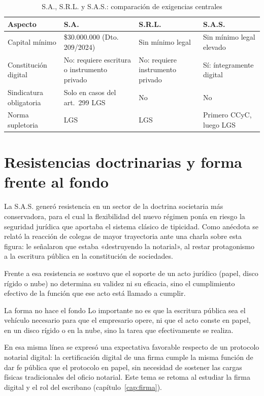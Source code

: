\documentclass[12pt,oneside]{book}
\begin{document}
\begin{table}[H]
\centering
\caption{S.A., S.R.L. y S.A.S.: comparación de exigencias centrales}
\renewcommand{\arraystretch}{1.2}
\begin{tabularx}{\textwidth}{>{\raggedright\arraybackslash}p{}XXX}
\toprule
\textbf{Aspecto} & \textbf{S.A.} & \textbf{S.R.L.} & \textbf{S.A.S.} \\
\midrule
Capital mínimo & \$30.000.000 (Dto. 209/2024) & Sin mínimo legal & Sin mínimo legal elevado \\
Constitución digital & No: requiere escritura o instrumento privado & No: requiere instrumento privado & Sí: íntegramente digital \\
Sindicatura obligatoria & Solo en casos del art.~299 LGS & No & No \\
Norma supletoria & LGS & LGS & Primero CCyC, luego LGS \\
\bottomrule
\end{tabularx}
\end{table}

\section{Resistencias doctrinarias y forma frente al fondo}
\label{sec:forma}

La S.A.S. generó resistencia en un sector de la doctrina societaria más conservadora, para el cual la flexibilidad del nuevo régimen ponía en riesgo la seguridad jurídica que aportaba el sistema clásico de tipicidad. Como anécdota se relató la reacción de colegas de mayor trayectoria ante una charla sobre esta figura: le señalaron que estaba «destruyendo la notarial», al restar protagonismo a la escritura pública en la constitución de sociedades.

Frente a esa resistencia se sostuvo que el soporte de un acto jurídico (papel, disco rígido o nube) no determina su validez ni su eficacia, sino el cumplimiento efectivo de la función que ese acto está llamado a cumplir.

\begin{concept}{La forma no hace el fondo}
Lo importante no es que la escritura pública sea el vehículo necesario para que el empresario opere, ni que el acto conste en papel, en un disco rígido o en la nube, sino la tarea que efectivamente se realiza.
\end{concept}

En esa misma línea se expresó una expectativa favorable respecto de un protocolo notarial digital: la certificación digital de una firma cumple la misma función de dar fe pública que el protocolo en papel, sin necesidad de sostener las cargas físicas tradicionales del oficio notarial. Este tema se retoma al estudiar la firma digital y el rol del escribano (capítulo~\ref{cap:firma}).
\end{document}
